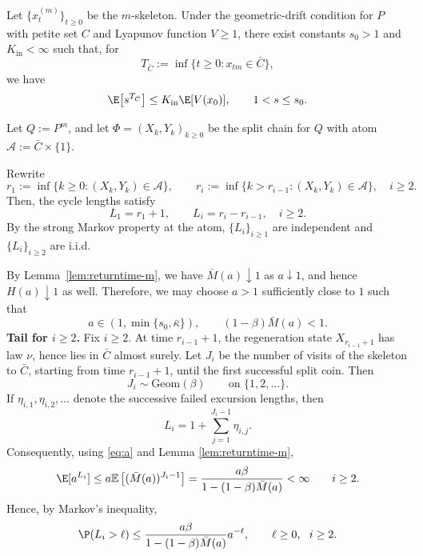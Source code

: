 \documentclass[mnsc,nonblindrev]{informs3}
\begin{document}
\begin{lemma}\label{lem:entrance-mgf}
Let \(\{x^{(m)}_t\}_{t\ge0}\) be the \(m\)-skeleton. Under the geometric-drift
condition for \(P\) with petite set \(C\) and Lyapunov function \(V\ge1\), there
exist constants \(s_0>1\) and \(K_{\mathrm{in}}<\infty\) such that, for
\[
T_{\bar C}:=\inf\{t\ge0:x_{tm}\in\bar C\},
\]
we have
\[
\E\!\left[s^{T_{\bar C}}\right]\le K_{\mathrm{in}}\E[V(x_0)],
\qquad 1<s\le s_0.
\]
\end{lemma}

Let \(Q:=P^m\), and let \(\Phi=(X_k,Y_k)_{k\ge0}\) be the split chain for \(Q\) with
atom $\mathcal A:=\bar C\times\{1\}.$

Rewrite
\[
r_1:=\inf\{k\ge0:(X_k,Y_k)\in\mathcal A\},\qquad
r_i:=\inf\{k>r_{i-1}:(X_k,Y_k)\in\mathcal A\},\quad i\ge2.
\]
Then, the cycle lengths satisfy
\[
L_1=r_1+1,\qquad L_i=r_i-r_{i-1},\quad i\ge2.
\]
By the strong Markov property at the atom, \(\{L_i\}_{i\ge1}\) are independent and
\(\{L_i\}_{i\ge2}\) are i.i.d.


By Lemma~\ref{lem:returntime-m}, we have \(\bar M(a)\downarrow 1\) as \(a\downarrow 1\), and hence \(H(a)\downarrow 1\) as well. Therefore, we may choose \(a>1\) sufficiently close to \(1\) such that
\begin{equation}\label{eq:a}
a\in(1,\min\{s_0,\bar\kappa\}),
\qquad
(1-\beta)\bar M(a)<1.
\end{equation}
\noindent
\textbf{Tail for \(i\ge2\).}
Fix \(i\ge2\). At time \(r_{i-1}+1\), the regeneration state
\(X_{r_{i-1}+1}\) has law \(\nu\), hence lies in \(\bar C\) almost surely. Let
\(J_i\) be the number of visits of the skeleton to \(\bar C\), starting from time
\(r_{i-1}+1\), until the first successful split coin. Then
\[
J_i\sim\mathrm{Geom}(\beta)\qquad\text{on }\{1,2,\dots\}.
\]
If \(\eta_{i,1},\eta_{i,2},\dots\) denote the successive failed excursion lengths,
then
\[
L_i=1+\sum_{j=1}^{J_i-1}\eta_{i,j}.
\]
Consequently, using \eqref{eq:a} and Lemma \ref{lem:returntime-m},
\[
\E[a^{L_i}]
 \leq a \mathbb{E}\left[(\bar{M}(a))^{J_i-1}\right]= \frac{a\beta}{1-(1-\beta) \bar{M}(a)}<\infty
\qquad i\ge2.
\]
Hence, by Markov's inequality,
\[
\P(L_i>\ell)\le \frac{a\beta}{1-(1-\beta) \bar{M}(a)} a^{-\ell},
\qquad \ell\ge0,\ \ i\ge2.
\]
\end{document}
